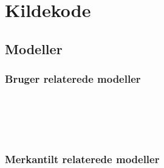 \chapter{Kildekode}
\label{appendix:sourcecode}

\section{Modeller}

\subsection{Bruger relaterede modeller}
\label{subsection:user-model}

\inputminted{csharp}{codefiles/models/ApplicationUser.cs}
\label{minted:application-user}

\inputminted{csharp}{codefiles/models/Customer.cs}
\label{minted:customer}

\inputminted{csharp}{codefiles/models/Employee.cs}
\label{minted:employee}

\inputminted{csharp}{codefiles/models/Guest.cs}
\label{minted:guest}

\inputminted{csharp}{codefiles/models/Address.cs}
\label{minted:address}

\inputminted{csharp}{codefiles/models/Company.cs}
\label{minted:company}

\subsection{Merkantilt relaterede modeller}
\label{appendix:mercantile-model}

\inputminted{csharp}{codefiles/models/Product.cs}
\label{minted:product}

\inputminted{csharp}{codefiles/models/Tag.cs}
\label{minted:tag}

\inputminted{csharp}{codefiles/models/Order.cs}
\label{minted:order}

\inputminted{csharp}{codefiles/models/OrderItem.cs}
\label{minted:order-item}

\inputminted{csharp}{codefiles/models/SpecialOrderInstruction.cs}
\label{minted:special-order-instruction}

\inputminted{csharp}{codefiles/models/Basket.cs}
\label{minted:basket}

\inputminted{csharp}{codefiles/models/BasketItem.cs}
\label{minted:basket-item}

\inputminted{csharp}{codefiles/models/BasketActivity.cs}
\label{minted:basketactivity}
